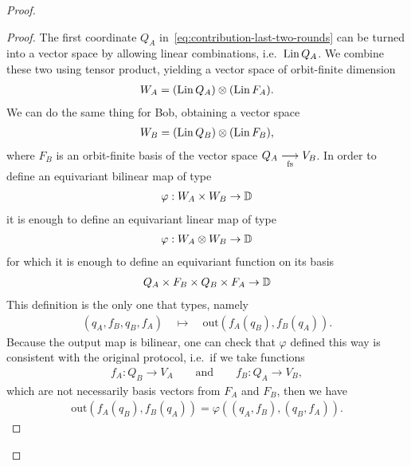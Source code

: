 \begin{proof}
\begin{proof}
        The first coordinate $Q_A$ in~\eqref{eq:contribution-last-two-rounds} can be turned into a vector space by  allowing linear combinations, i.e.~$\operatorname{Lin} Q_A$. We combine these two using tensor product, yielding a vector space of orbit-finite dimension
        \begin{align*}
           W_A =  (\operatorname{Lin} Q_A) \otimes (\operatorname{Lin} F_A).
        \end{align*}
        We can do the same thing for Bob, obtaining a vector space
        \begin{align*}
           W_B =  (\operatorname{Lin} Q_B) \otimes (\operatorname{Lin} F_B),
        \end{align*}
        where $F_B$ is an orbit-finite basis of the vector space $Q_A \underset{\text{fs}}{\longrightarrow} V_B$.
        In order to define an equivariant bilinear map of type
        \begin{align*}
        \varphi : W_A \times W_B \to \mathbb D
        \end{align*}
        it is enough to define an equivariant linear map of type 
        \begin{align*}
        \varphi : W_A \otimes W_B \to \mathbb D
        \end{align*}
        for which it is enough to define an equivariant function on its basis
        \begin{align*}
        Q_A \times F_B \times Q_B \times F_A \to \mathbb D
        \end{align*}
        This definition is the only one that types, namely 
        \begin{align*}
        (q_A, f_B, q_B, f_A) \quad 
        \mapsto \quad 
        \text{out}(f_A(q_B), f_B(q_A)).
        \end{align*}
        Because the output map is bilinear, one can check that $\varphi$ defined this way is consistent with the original protocol, i.e.~if we take functions 
        \begin{align*}
        f_A : Q_B \to V_A \qquad \text{and} \qquad f_B : Q_A \to V_B,
        \end{align*}
        which are not necessarily basis vectors from $F_A$ and $F_B$, then we have 
        \begin{align*}
        \text{out}(f_A(q_B), f_B(q_A)) = \varphi((q_A, f_B), (q_B, f_A)).
        \end{align*}

\end{proof}
\end{proof}

